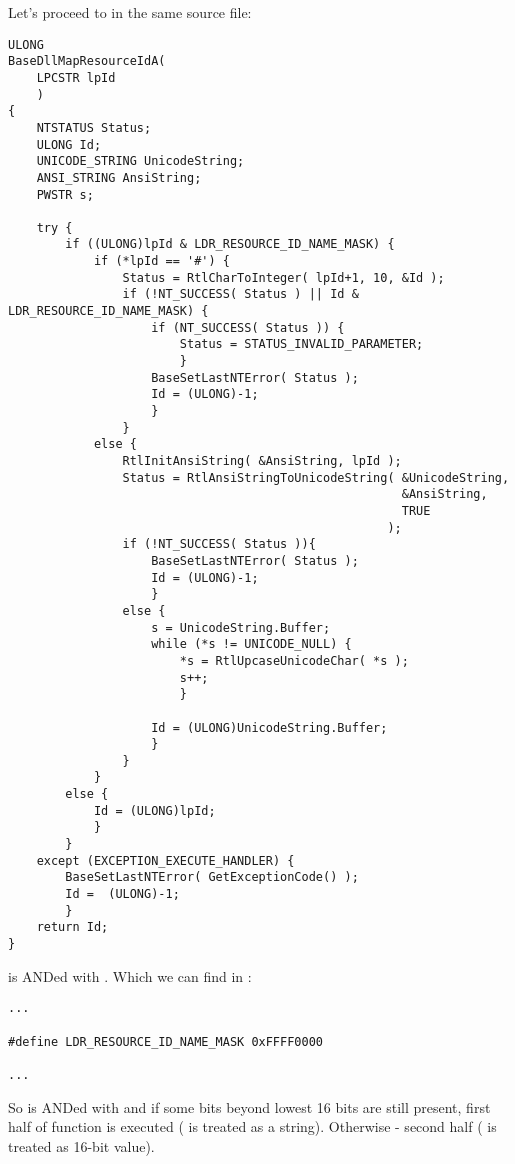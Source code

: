 Let's proceed to  in the same source file:

\begin{lstlisting}[style=customc]
ULONG
BaseDllMapResourceIdA(
    LPCSTR lpId
    )
{
    NTSTATUS Status;
    ULONG Id;
    UNICODE_STRING UnicodeString;
    ANSI_STRING AnsiString;
    PWSTR s;

    try {
        if ((ULONG)lpId & LDR_RESOURCE_ID_NAME_MASK) {
            if (*lpId == '#') {
                Status = RtlCharToInteger( lpId+1, 10, &Id );
                if (!NT_SUCCESS( Status ) || Id & LDR_RESOURCE_ID_NAME_MASK) {
                    if (NT_SUCCESS( Status )) {
                        Status = STATUS_INVALID_PARAMETER;
                        }
                    BaseSetLastNTError( Status );
                    Id = (ULONG)-1;
                    }
                }
            else {
                RtlInitAnsiString( &AnsiString, lpId );
                Status = RtlAnsiStringToUnicodeString( &UnicodeString,
                                                       &AnsiString,
                                                       TRUE
                                                     );
                if (!NT_SUCCESS( Status )){
                    BaseSetLastNTError( Status );
                    Id = (ULONG)-1;
                    }
                else {
                    s = UnicodeString.Buffer;
                    while (*s != UNICODE_NULL) {
                        *s = RtlUpcaseUnicodeChar( *s );
                        s++;
                        }

                    Id = (ULONG)UnicodeString.Buffer;
                    }
                }
            }
        else {
            Id = (ULONG)lpId;
            }
        }
    except (EXCEPTION_EXECUTE_HANDLER) {
        BaseSetLastNTError( GetExceptionCode() );
        Id =  (ULONG)-1;
        }
    return Id;
}
\end{lstlisting}

 is ANDed with . Which we can find in :

\begin{lstlisting}[style=customc]
...

#define LDR_RESOURCE_ID_NAME_MASK 0xFFFF0000

...
\end{lstlisting}

So  is ANDed with  and if some bits beyond lowest 16 bits are still present,
first half of function is executed ( is treated as a string).
Otherwise - second half ( is treated as 16-bit value).

